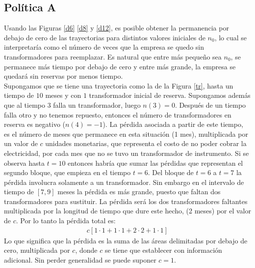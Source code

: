 \subsection{Pol\'itica A}

\noindent Usando las Figuras \ref{d6} \ref{d8} y \ref{d12}, es posible obtener la permanencia por debajo de cero de las trayectorias para distintos valores iniciales de $n_0$, lo cual se interpretar\'ia como el n\'umero de veces que la empresa se quedo sin transformadores para reemplazar. Es natural que entre m\'as peque\~no sea $n_0$, se permanece m\'as tiempo por debajo de cero y entre m\'as grande, la empresa se quedar\'a sin reservas por menos tiempo.\\[0.1cm]
\noindent Supongamos que se tiene una trayectoria como la de la Figura \ref{tr}, hasta un tiempo de $10$ meses y con $1$ transformador inicial de reserva. Supongamos adem\'as que al tiempo 3 falla un transformador, luego  $n(3)=0$. Despu\'es de un tiempo falla otro y no tenemos repuesto, entonces el n\'umero de transformadores en reserva es negativo ($n(4)=-1$). La p\'erdida asociada a partir de este tiempo, es el n\'umero de meses que permanece en esta situaci\'on (1 mes), multiplicada por un valor de $c$ unidades monetarias, que representa el costo de no poder cobrar la electricidad, por cada mes que no se tuvo un transformador de instrumento. Si se observa hasta $t=10$ entonces habr\'ia que sumar las p\'erdidas que representan el segundo bloque, que empieza en el tiempo $t=6$. Del bloque de $t=6$ a $t=7$ la p\'erdida involucra solamente a un transformador. Sin embargo en el intervalo de tiempo de $[7,9]$ meses la p\'erdida es m\'as grande, puesto que faltan dos transformadores para sustituir. La p\'erdida  ser\'a  los dos transformadores faltantes multiplicada por la longitud de tiempo que dure este hecho, (2 meses) por el valor de $c$. Por lo tanto la p\'erdida  total es:
\begin{eqnarray*}
c[1\cdot1 + 1\cdot1+2\cdot2+1\cdot1]
\end{eqnarray*} 
Lo que significa que la p\'erdida es la suma de las \'areas delimitadas por debajo de cero, multiplicada por $c$, donde $c$ se tiene que establecer con informaci\'on adicional. Sin perder generalidad se puede suponer $c=1$.\\[0.2cm]

